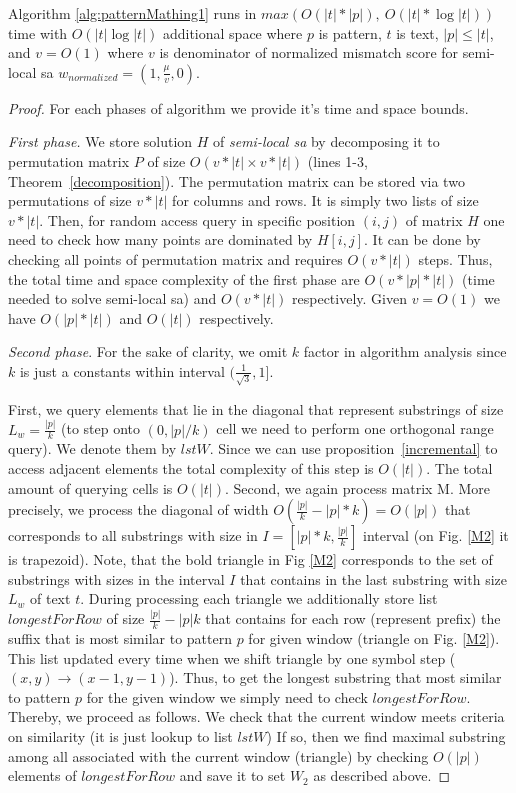 \begin{theorem}
Algorithm \ref{alg:patternMathing1} runs in $max(O(|t|*|p|),\ O(|t| * \log |t|))$ time with $O( |t| \log |t|)$ additional space where $p$ is pattern, $t$ is text, $|p| \leq |t|$, and $v=O(1)$ where $v$ is denominator of normalized mismatch score for semi-local sa $w_{normalized} = (1,\frac{\mu}{v},0)$.
\end{theorem}
\begin{proof}
  For each phases of algorithm we provide it's time and space bounds.
  
\emph{First phase.}
We store solution $H$ of \emph{semi-local sa} by decomposing it to permutation matrix $P$ of size $O(v*|t| \times v*|t|)$ (lines 1-3, Theorem~\ref{decomposition}).
The permutation matrix can be stored via two permutations of size $v*|t|$ for columns and rows.
It is simply two lists of size $v*|t|$.
Then, for random access query in specific position $(i,j)$ of matrix $H$ one need to check how many points are dominated by $H [i,j]$.
It can be done by checking all points of permutation matrix and requires $O(v * |t|)$ steps.
Thus, the total time and space complexity of the first phase are $O(v *|p| * |t|)$ (time needed to solve semi-local sa) and $O(v*|t|)$ respectively.
Given $v=O(1)$ we have $O(|p| * |t|)$ and $O(|t|)$ respectively.

\emph{Second phase}.
For the sake of clarity, we omit $k$ factor in algorithm analysis since $k$ is just a constants within interval $(\frac{1}{\sqrt{3}},1]$.

First, we query elements that lie in the diagonal that represent
substrings of size $L_{w}=\frac{|p|}{k}$ (to step onto $(0,|p|/k)$ cell we need to perform one orthogonal range query).
We denote them by $lstW$.
Since we can use proposition~\ref{incremental} to access
adjacent elements 
the total complexity of this step is $O(|t|)$.
The total amount of querying cells is $O(|t|)$. 
Second, we again process matrix M.
More precisely, we process the diagonal of width $O(\frac{|p|}{k}-|p|*k)=O(|p|)$ that corresponds to all substrings with size in  $I=[|p|*k, \frac{|p|}{k}]$ interval (on Fig. \ref{M2} it is  trapezoid).
Note, that the bold triangle in Fig  \ref{M2} corresponds to the set of substrings with sizes in the interval $I$ that contains in the last substring with size $L_{w}$ of text $t$.
During processing each triangle we  additionally store list $longestForRow$ of size $\frac{|p|}{k}-|p|k$ that contains
for each row (represent prefix) the suffix that is most similar to pattern $p$ for given window (triangle on Fig. \ref{M2}).
This list updated every time when we shift triangle by one symbol step ($(x,y)\rightarrow (x-1,y-1)$).
Thus, to get the longest substring that most similar to pattern $p$ for the given window we simply need
to check $longestForRow$. 
Thereby, we proceed as follows.
We check that the current window meets criteria
on similarity (it is just lookup to list $lstW$)
If so, then we find maximal substring among all associated with the current window (triangle) by checking $O(|p|)$ elements of $longestForRow$ and save it to set $W_{2}$ as described above.


\end{proof}
